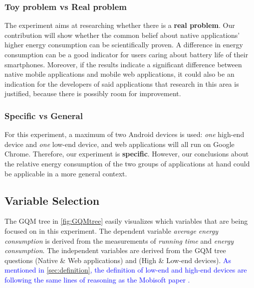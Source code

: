 	\subsubsection*{Toy problem vs Real problem}
	The experiment aims at researching whether there is a \textbf{real problem}. Our contribution will show whether the common belief about native applications' higher energy consumption can be scientifically proven. A difference in energy consumption can be a good indicator for users caring about battery life of their smartphones. Moreover, if the results indicate a significant difference between native mobile applications and mobile web applications, it could also be an indication for the developers of said applications that research in this area is justified, because there is possibly room for improvement.
	\\
	\subsubsection*{Specific vs General}
	For this experiment, a maximum of two Android devices is used: \textit{one} high-end device and \textit{one} low-end device, and web applications will all run on Google Chrome. Therefore, our experiment is \textbf{specific}. However, our conclusions about the relative energy consumption of the two groups of applications at hand could be applicable in a more general context.
	\\
	\subsection{Variable Selection}
	The GQM tree in \autoref{fig:GQMtree} easily visualizes which variables that are being focused on in this experiment. The dependent variable \textit{average energy consumption} is derived from the measurements of \textit{running time} and \textit{energy consumption}. The independent variables are derived from the GQM tree questions (Native \& Web applications) and (High \& Low-end devices).  \textcolor{blue}{As mentioned in \autoref{sec:definition}, the definition of low-end and high-end devices are following the same lines of reasoning as the Mobisoft paper \cite{mobisoft2017}.}



 